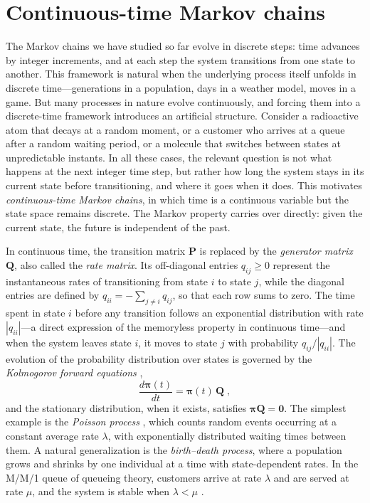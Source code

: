 \section{Continuous-time Markov chains}


The Markov chains we have studied so far evolve in discrete steps: time advances by integer increments, and at each step the system transitions from one state to another. This framework is natural when the underlying process itself unfolds in discrete time---generations in a population, days in a weather model, moves in a game. But many processes in nature evolve continuously, and forcing them into a discrete-time framework introduces an artificial structure. Consider a radioactive atom that decays at a random moment, or a customer who arrives at a queue after a random waiting period, or a molecule that switches between states at unpredictable instants. In all these cases, the relevant question is not what happens at the next integer time step, but rather how long the system stays in its current state before transitioning, and where it goes when it does. This motivates \textit{continuous-time Markov chains}, in which time is a continuous variable but the state space remains discrete. The Markov property carries over directly: given the current state, the future is independent of the past.

\medskip

In continuous time, the transition matrix $\mathbf{P}$ is replaced by the \textit{generator matrix} $\mathbf{Q}$, also called the \textit{rate matrix}. Its off-diagonal entries $q_{ij} \ge 0$ represent the instantaneous rates of transitioning from state $i$ to state $j$, while the diagonal entries are defined by $q_{ii} = -\sum_{j \neq i} q_{ij}$, so that each row sums to zero. The time spent in state $i$ before any transition follows an exponential distribution with rate $|q_{ii}|$---a direct expression of the memoryless property in continuous time---and when the system leaves state $i$, it moves to state $j$ with probability $q_{ij}/|q_{ii}|$. The evolution of the probability distribution over states is governed by the \textit{Kolmogorov forward equations} \cite{kolmogorov_1933_grundbegriffe},
\begin{equation}
    \frac{d\boldsymbol{\pi}(t)}{dt} = \boldsymbol{\pi}(t)\,\mathbf{Q} \; ,
\end{equation}
and the stationary distribution, when it exists, satisfies $\boldsymbol{\pi}\mathbf{Q} = \mathbf{0}$. The simplest example is the \textit{Poisson process} \cite{poisson_1837_judgements}, which counts random events occurring at a constant average rate $\lambda$, with exponentially distributed waiting times between them. A natural generalization is the \textit{birth--death process}, where a population grows and shrinks by one individual at a time with state-dependent rates. In the M/M/1 queue of queueing theory, customers arrive at rate $\lambda$ and are served at rate $\mu$, and the system is stable when $\lambda < \mu$ \cite{kendall_1953_queue}.

